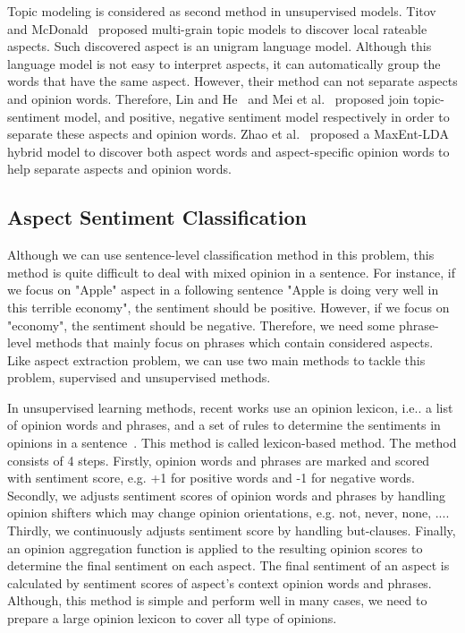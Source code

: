 \documentclass{article}
\begin{document}
Topic modeling is considered as second method in unsupervised models.
Titov and McDonald~\cite{Titov:2008:MOR:1367497.1367513} proposed multi-grain topic models to discover local rateable aspects. 
Such discovered aspect is an unigram language model.
Although this language model is not easy to interpret aspects, it can automatically group the words that have the same aspect.
However, their method can not separate aspects and opinion words.
Therefore, Lin and He~\cite{Lin:2009:JSM:1645953.1646003} and Mei et al.~\cite{Mei:2007:TSM:1242572.1242596} proposed join topic-sentiment model, and positive, negative sentiment model respectively in order to separate these aspects and opinion words.
Zhao et al.~\cite{citeulike:9605702} proposed a MaxEnt-LDA hybrid model to discover both aspect words and aspect-specific opinion words to help separate aspects and opinion words.

\subsection{Aspect Sentiment Classification}
Although we can use sentence-level classification method in this problem, this method is quite difficult to deal with mixed opinion in a sentence.
For instance, if we focus on "Apple" aspect in a following sentence "Apple is doing very well in this terrible economy", the sentiment should be positive. 
However, if we focus on "economy", the sentiment should be negative.
Therefore, we need some phrase-level methods that mainly focus on phrases which contain considered aspects.
Like aspect extraction problem, we can use two main methods to tackle this problem, supervised and unsupervised methods.

In unsupervised learning methods, recent works use an opinion lexicon, i.e.. a list of opinion words and phrases, and a set of rules to determine the sentiments in opinions in a sentence~\cite{Ding:2008:HLA:1341531.1341561,Hu:2004:MSC:1014052.1014073}. 
This method is called lexicon-based method.
The method consists of 4 steps.
Firstly, opinion words and phrases are marked and scored with sentiment score, e.g. +1 for positive words and -1 for negative words.
Secondly, we adjusts sentiment scores of opinion words and phrases by handling opinion shifters which may change opinion orientations, e.g. not, never, none, ....
Thirdly, we continuously adjusts sentiment score by handling but-clauses.
Finally, an opinion aggregation function is applied to the resulting opinion scores to determine the final sentiment on each aspect.
The final sentiment of an aspect is calculated by sentiment scores of aspect's context opinion words and phrases.
Although, this method is simple and perform well in many cases, we need to prepare a large opinion lexicon to cover all type of opinions. 
\end{document}
